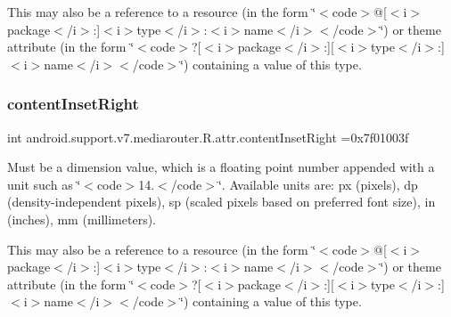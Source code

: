 This may also be a reference to a resource (in the form \char`\"{}$<$code$>$@\mbox{[}$<$i$>$package$<$/i$>$\+:\mbox{]}$<$i$>$type$<$/i$>$\+:$<$i$>$name$<$/i$>$$<$/code$>$\char`\"{}) or theme attribute (in the form \char`\"{}$<$code$>$?\mbox{[}$<$i$>$package$<$/i$>$\+:\mbox{]}\mbox{[}$<$i$>$type$<$/i$>$\+:\mbox{]}$<$i$>$name$<$/i$>$$<$/code$>$\char`\"{}) containing a value of this type. \mbox{\label{classandroid_1_1support_1_1v7_1_1mediarouter_1_1R_1_1attr_ac57c06096a1114b7df0d88f8fe7d666b}} 
\subsubsection{\texorpdfstring{content\+Inset\+Right}{contentInsetRight}}
{\footnotesize\ttfamily int android.\+support.\+v7.\+mediarouter.\+R.\+attr.\+content\+Inset\+Right =0x7f01003f\hspace{0.3cm}{\ttfamily [static]}}

Must be a dimension value, which is a floating point number appended with a unit such as \char`\"{}$<$code$>$14.\+5sp$<$/code$>$\char`\"{}. Available units are\+: px (pixels), dp (density-\/independent pixels), sp (scaled pixels based on preferred font size), in (inches), mm (millimeters). 

This may also be a reference to a resource (in the form \char`\"{}$<$code$>$@\mbox{[}$<$i$>$package$<$/i$>$\+:\mbox{]}$<$i$>$type$<$/i$>$\+:$<$i$>$name$<$/i$>$$<$/code$>$\char`\"{}) or theme attribute (in the form \char`\"{}$<$code$>$?\mbox{[}$<$i$>$package$<$/i$>$\+:\mbox{]}\mbox{[}$<$i$>$type$<$/i$>$\+:\mbox{]}$<$i$>$name$<$/i$>$$<$/code$>$\char`\"{}) containing a value of this type. \mbox{\label{classandroid_1_1support_1_1v7_1_1mediarouter_1_1R_1_1attr_a26b877aa26d7c68054fe041baffc1882}} 
